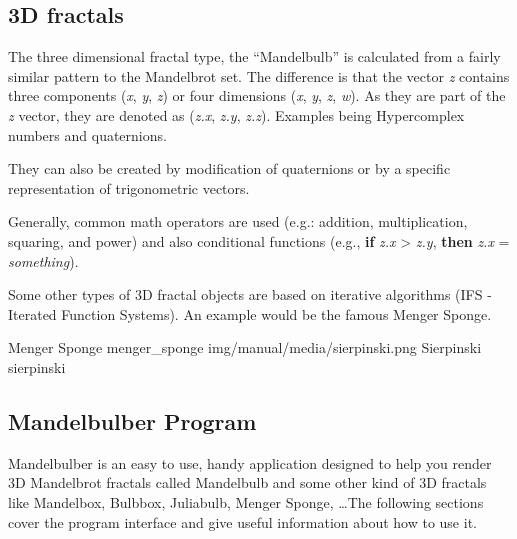 \subsection{3D fractals}\label{d-fractals}

The three dimensional fractal type, the ``Mandelbulb'' is calculated from a
fairly similar pattern to the Mandelbrot set. The difference is that the vector
\emph{z} contains three components (\emph{x}, \emph{y}, \emph{z}) or four
dimensions (\emph{x}, \emph{y}, \emph{z}, \emph{w}). As they are part of the
\emph{z} vector, they are denoted as (\emph{z.x}, \emph{z.y}, \emph{z.z}).
Examples being Hypercomplex numbers and quaternions.

They can also be created by modification of quaternions or by a specific
representation of trigonometric vectors. 

Generally, common math operators are
used (e.g.: addition, multiplication, squaring, and power) and also
conditional functions (e.g., \textbf{if} \emph{z.x} \textgreater{} \emph{z.y},
\textbf{then} \emph{z.x} = \emph{something}).

Some other types of 3D fractal objects are based on iterative algorithms (IFS -
Iterated Function Systems). An example would be the famous Menger Sponge.
\nopagebreak

{Menger Sponge}
{menger_sponge}
{img/manual/media/sierpinski.png}
{Sierpinski}
{sierpinski}

\subsection{Mandelbulber Program}\label{mandelbulber-program}

Mandelbulber is an easy to use, handy application designed to help you render 3D
Mandelbrot fractals called Mandelbulb and some other kind of 3D fractals like
Mandelbox, Bulbbox, Juliabulb, Menger Sponge, \dots The following sections
cover the program interface and give useful information about how to use it.
